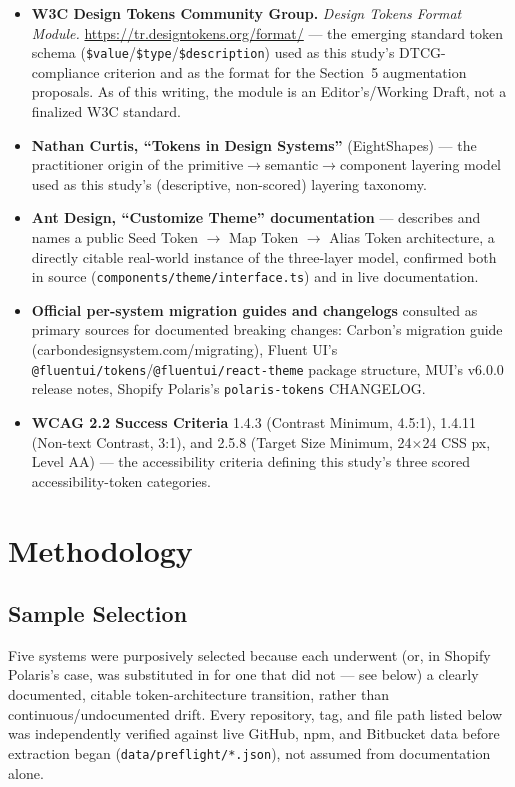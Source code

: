 \documentclass[11pt]{article}
\begin{document}
\begin{itemize}[leftmargin=1.4em]
\item \textbf{W3C Design Tokens Community Group.} \emph{Design Tokens Format Module.} \url{https://tr.designtokens.org/format/} --- the emerging standard token schema (\texttt{\$value}/\texttt{\$type}/\texttt{\$description}) used as this study's DTCG-compliance criterion and as the format for the Section~5 augmentation proposals. As of this writing, the module is an Editor's/Working Draft, not a finalized W3C standard.
\item \textbf{Nathan Curtis, ``Tokens in Design Systems''} (EightShapes) --- the practitioner origin of the primitive\(\to\)semantic\(\to\)component layering model used as this study's (descriptive, non-scored) layering taxonomy.
\item \textbf{Ant Design, ``Customize Theme'' documentation} --- describes and names a public Seed Token \(\to\) Map Token \(\to\) Alias Token architecture, a directly citable real-world instance of the three-layer model, confirmed both in source (\texttt{components/theme/interface.ts}) and in live documentation.
\item \textbf{Official per-system migration guides and changelogs} consulted as primary sources for documented breaking changes: Carbon's migration guide (carbondesignsystem.com/migrating), Fluent UI's \texttt{@fluentui/tokens}/\texttt{@fluentui/react-theme} package structure, MUI's v6.0.0 release notes, Shopify Polaris's \texttt{polaris-tokens} CHANGELOG.
\item \textbf{WCAG 2.2 Success Criteria} 1.4.3 (Contrast Minimum, 4.5:1), 1.4.11 (Non-text Contrast, 3:1), and 2.5.8 (Target Size Minimum, 24\(\times\)24 CSS px, Level AA) --- the accessibility criteria defining this study's three scored accessibility-token categories.
\end{itemize}

\section{Methodology}

\subsection{Sample Selection}

Five systems were purposively selected because each underwent (or, in Shopify Polaris's case, was substituted in for one that did not --- see below) a clearly documented, citable token-architecture transition, rather than continuous/undocumented drift. Every repository, tag, and file path listed below was independently verified against live GitHub, npm, and Bitbucket data before extraction began (\texttt{data/preflight/*.json}), not assumed from documentation alone.
\end{document}
